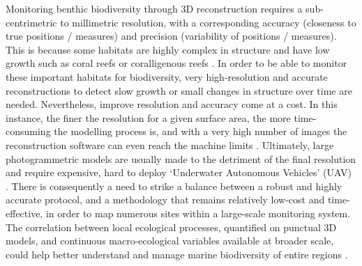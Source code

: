 Monitoring benthic biodiversity through 3D reconstruction requires a sub-centrimetric to millimetric resolution, with a corresponding accuracy (closeness to true positions / measures) and precision (variability of positions / measures). This is because some habitats are highly complex in structure and have low growth such as coral reefs \citep{pratchett_spatial_2015} or coralligenous reefs \citep{ballesteros_mediterranean_2006, garrabou_growth_2000, sartoretto_structure_1994}. In order to be able to monitor these important habitats for biodiversity, very high-resolution and accurate reconstructions to detect slow growth or small changes in structure over time are needed. Nevertheless, improve resolution and accuracy come at a cost. In this instance, the finer the resolution for a given surface area, the more time-consuming the modelling process is, and with a very high number of images the reconstruction software can even reach the machine limits \citep{agisoft_agisoft_2018-1}. Ultimately, large photogrammetric models are usually made to the detriment of the final resolution and require expensive, hard to deploy ‘Underwater Autonomous Vehicles’ (UAV) \citep{johnson-roberson_generation_2010}. There is consequently a need to strike a balance between a robust and highly accurate protocol, and a methodology that remains relatively low-cost and time-effective, in order to map numerous sites within a large-scale monitoring system. The correlation between local ecological processes, quantified on punctual 3D models, and continuous macro-ecological variables available at broader scale, could help better understand and manage marine biodiversity of entire regions \citep{gonzalez-rivero_scaling_2016}.

